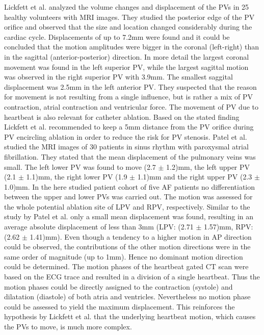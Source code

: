 Lickfett et al. \cite{Lic05} analyzed the volume changes and displacement of the PVs in 25 healthy volunteers with MRI images. They 
studied the posterior edge of the PV orifice and observed that the size and location changed considerably during the cardiac cycle. 
Displacements of up to 7.2mm were found and it could be concluded that the motion amplitudes were bigger in the coronal (left-right) 
than in the sagittal (anterior-posterior) direction. In more detail the largest coronal movement was found in the left superior PV, 
while the largest sagittal motion was observed in the right superior PV with 3.9mm. The smallest saggital displacement was 2.5mm in the 
left anterior PV. They suspected that the reason for movement is not resulting from a single influence, but is rather a mix of PV 
contraction, atrial contraction and ventricular force. The movement of PV due to heartbeat is also relevant for catheter ablation. Based 
on the stated finding Lickfett et al. recommended to keep a 5mm distance from the PV orifice during PV encircling ablation in order to 
reduce the risk for PV stenosis. 
Patel et al. \cite{Pat08} studied the MRI images of 30 patients in sinus rhythm with paroxysmal atrial fibrillation. They  
stated that the mean displacement of the pulmonary veins was small. The left lower PV was found to move (2.7 $\pm$ 1.2)mm, the left upper PV 
(2.1 $\pm$ 1.1)mm, the right lower PV (1.9 $\pm$ 1.1)mm and the right upper PV (2.3 $\pm$ 1.0)mm.\newline 
\newline
In the here studied patient cohort of five AF patients no differentiation between the upper and lower PVs was carried out. 
The motion was assessed for the whole potential ablation site of LPV and RPV, respectively. Similar to the study by Patel et al. only a small 
mean displacement was found, resulting in an average absolute displacement of less than 3mm (LPV: (2.71 $\pm$ 1.57)mm, RPV: (2.62 $\pm$ 1.41)mm). 
Even though a tendency to a higher motion in AP direction could be observed, the contributions of the other motion directions 
were in the same order of magnitude (up to 1mm). Hence no dominant motion direction could be determined. 
The motion phases of the heartbeat gated CT scan were based on the ECG trace and resulted in a division of a single heartbeat. Thus the motion 
phases could be directly assigned to the contraction (systole) and dilatation (diastole) of both atria and ventricles. 
Nevertheless no motion phase could be assessed to yield the maximum displacement. This reinforces the hypothesis by Lickfett et al. that the 
underlying heartbeat motion, which causes the PVs to move, is much more complex. 

